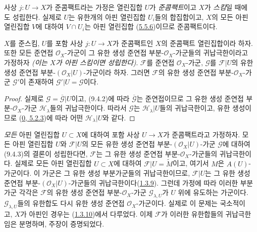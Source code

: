 사상 $j:U\to X$가 준콤팩트라는 가정은 열린집합 $U$가
\emph{준콤팩트}이고 $X$가 \emph{스킴}일 때에도 성립한다. 실제로
$U$는 유한개의 아핀 열린집합 $U_i$들의 합집합이고, $X$의 모든 아핀
열린집합 $V$에 대하여 $V\cap U_i$는 아핀 열린집합
(\hyperref[I.5.5.6-ko]{5.5.6})이므로 준콤팩트이다.

\begin{corollary}[9.4.3]
\label{I.9.4.3-ko}
$X$를 준스킴, $U$를 포함 사상 $j:U\to X$가 준콤팩트인 $X$의
준콤팩트 열린집합이라 하자. 또한 모든 준연접 $\mathscr{O}_X$-가군이
그 유한 생성 준연접 부분-$\mathscr{O}_X$-가군들의 귀납극한이라고
가정하자 \emph{(이는 $X$가 \emph{아핀 스킴}이면 성립한다)}.
$\mathscr{F}$를 준연접 $\mathscr{O}_X$-가군,
$\mathscr{G}$를 $\mathscr{F}|U$의 유한 생성 준연접
부분-$(\mathscr{O}_X|U)$-가군이라 하자. 그러면 $\mathscr{F}$의
유한 생성 준연접 부분-$\mathscr{O}_X$-가군 $\mathscr{G}'$이 존재하여
$\mathscr{G}'|U=\mathscr{G}$이다.
\end{corollary}

\begin{proof}
실제로 $\mathscr{G}=\overline{\mathscr{G}}|U$이고, (9.4.2)에 따라
$\overline{\mathscr{G}}$는 준연접이므로 그 유한 생성 준연접
부분-$\mathscr{O}_X$-가군 $\mathscr{H}_\lambda$들의 귀납극한이다.
따라서 $\mathscr{G}$는 $\mathscr{H}_\lambda|U$들의 귀납극한이고,
유한 생성이므로 (\hyperref[0.5.2.3-ko]{0, 5.2.3})에 따라 어떤
$\mathscr{H}_\lambda|U$와 같다.
\end{proof}

\begin{remark}[9.4.4]
\label{I.9.4.4-ko}
\emph{모든} 아핀 열린집합 $U\subset X$에 대하여 포함 사상
$U\to X$가 준콤팩트라고 가정하자. 모든 아핀 열린집합 $U$와
$\mathscr{F}|U$의 모든 유한 생성 준연접
부분-$(\mathscr{O}_X|U)$-가군 $\mathscr{G}$에 대하여 (9.4.3)의 결론이
성립한다면,
$\mathscr{F}$는 그 유한 생성 준연접 부분-$\mathscr{O}_X$-가군들의
귀납극한이다. 실제로 모든 아핀 열린집합 $U\subset X$에 대하여
$\mathscr{F}|U=\widetilde{M}$이고, 여기서 $M$은 $A(U)$-가군이다.
이 가군은 그 유한 생성 부분가군들의 귀납극한이므로,
$\mathscr{F}|U$는 그 유한 생성 준연접 부분-$(\mathscr{O}_X|U)$-가군들의
귀납극한이다(\hyperref[I.1.3.9-ko]{1.3.9}). 그런데 가정에 따라 이러한
부분가군 각각은 $\mathscr{F}$의 유한 생성 준연접
부분-$\mathscr{O}_X$-가군 $\mathscr{G}_{\lambda,U}$가 $U$ 위에 유도하는
가군이다. $\mathscr{G}_{\lambda,U}$들의 유한합도 다시 유한 생성
준연접 $\mathscr{O}_X$-가군이다. 실제로 이 문제는 국소적이고,
$X$가 아핀인 경우는 (\hyperref[I.1.3.10-ko]{1.3.10})에서 다루었다.
이제 $\mathscr{F}$가 이러한 유한합들의 귀납극한임은 분명하며,
주장이 증명되었다.
\end{remark}

